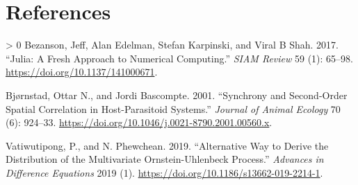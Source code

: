 \documentclass{article}
\newlength{\cslhangindent}
\newenvironment{CSLReferences}[3] %
 {%
  \setlength{\parindent}{0pt}
  \ifodd #1 \everypar{\setlength{\hangindent}{\cslhangindent}}\ignorespaces\fi
  \ifnum #2 > 0
  \setlength{\parskip}{#2\baselineskip}
  \fi
 }%
 {}
\begin{document}
\newpage

\hypertarget{references}{%
\section*{References}\label{references}}

\hypertarget{refs}{}
\begin{CSLReferences}{1}{0}
\leavevmode\hypertarget{ref-Julia-2017}{}%
Bezanson, Jeff, Alan Edelman, Stefan Karpinski, and Viral B Shah. 2017.
{``Julia: A Fresh Approach to Numerical Computing.''} \emph{SIAM
{R}eview} 59 (1): 65--98. \url{https://doi.org/10.1137/141000671}.

\leavevmode\hypertarget{ref-Bjrnstad2001}{}%
Bjørnstad, Ottar N., and Jordi Bascompte. 2001. {``Synchrony and
Second-Order Spatial Correlation in Host-Parasitoid Systems.''}
\emph{Journal of Animal Ecology} 70 (6): 924--33.
\url{https://doi.org/10.1046/j.0021-8790.2001.00560.x}.

\leavevmode\hypertarget{ref-Vatiwutipong2019}{}%
Vatiwutipong, P., and N. Phewchean. 2019. {``Alternative Way to Derive
the Distribution of the Multivariate Ornstein-Uhlenbeck Process.''}
\emph{Advances in Difference Equations} 2019 (1).
\url{https://doi.org/10.1186/s13662-019-2214-1}.

\end{CSLReferences}



\end{document}
